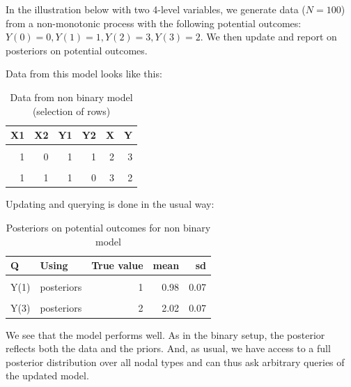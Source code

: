 \documentclass[
  12pt,
]{book}
\begin{document}
In the illustration below with two 4-level variables, we generate data (\(N=100\)) from a non-monotonic process with the following potential outcomes: \(Y(0)=0, Y(1)=1, Y(2)=3, Y(3) = 2\). We then update and report on posteriors on potential outcomes.

Data from this model looks like this:

\begin{table}

\caption{\label{tab:unnamed-chunk-13}Data from non binary model (selection of rows)}
\centering
\begin{tabular}[t]{rrrrrr}
\toprule
X1 & X2 & Y1 & Y2 & X & Y\\
\midrule
\cellcolor{gray!6}{0} & \cellcolor{gray!6}{0} & \cellcolor{gray!6}{0} & \cellcolor{gray!6}{0} & \cellcolor{gray!6}{0} & \cellcolor{gray!6}{0}\\
1 & 0 & 1 & 1 & 2 & \vphantom{1} 3\\
\cellcolor{gray!6}{1} & \cellcolor{gray!6}{0} & \cellcolor{gray!6}{1} & \cellcolor{gray!6}{1} & \cellcolor{gray!6}{2} & \cellcolor{gray!6}{3}\\
1 & 1 & 1 & 0 & 3 & 2\\
\bottomrule
\end{tabular}
\end{table}

Updating and querying is done in the usual way:

\begin{table}

\caption{\label{tab:unnamed-chunk-15}Posteriors on potential outcomes for non binary model}
\centering
\begin{tabular}[t]{llrrr}
\toprule
Q & Using & True value & mean & sd\\
\midrule
\cellcolor{gray!6}{Y(0)} & \cellcolor{gray!6}{posteriors} & \cellcolor{gray!6}{0} & \cellcolor{gray!6}{0.37} & \cellcolor{gray!6}{0.08}\\
Y(1) & posteriors & 1 & 0.98 & 0.07\\
\cellcolor{gray!6}{Y(2)} & \cellcolor{gray!6}{posteriors} & \cellcolor{gray!6}{3} & \cellcolor{gray!6}{2.60} & \cellcolor{gray!6}{0.09}\\
Y(3) & posteriors & 2 & 2.02 & 0.07\\
\bottomrule
\end{tabular}
\end{table}

We see that the model performs well. As in the binary setup, the posterior reflects both the data and the priors. And, as usual, we have access to a full posterior distribution over all nodal types and can thus ask arbitrary queries of the updated model.
\end{document}
